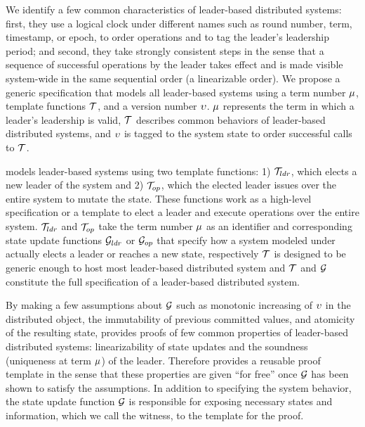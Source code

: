 We identify a few common characteristics of leader-based distributed systems:
first, they use a logical clock under different names such as round number,
term, timestamp, or epoch, to order operations and to tag the leader's
leadership period;
and second, they take strongly consistent steps in the sense that a
sequence of successful operations by the leader takes effect and is made visible
system-wide in the same sequential order (a linearizable order).
We propose a generic specification that models all leader-based systems using a
term number $\mu$, template functions $\mathcal{T}$, and
a version number $\upsilon$. $\mu$ represents the term in which a leader's leadership is valid,
$\mathcal{T}$ describes common behaviors of leader-based distributed systems,
and $\upsilon$ is tagged to the system state to order successful calls to $\mathcal{T}$.


\sysname{} models leader-based systems using two template functions:
1) $\mathcal{T}_{ldr}$, which elects a new leader of the system and
2) $\mathcal{T}_{op}$, which the elected leader issues over the entire system
to mutate the state. These functions work as a high-level specification or a
template to elect a leader and execute operations over the entire system.
$\mathcal{T}_{ldr}$ and $\mathcal{T}_{op}$ take the term number $\mu$ as an identifier
and corresponding state update functions $\mathcal{G}_{ldr}$ or
$\mathcal{G}_{op}$ that specify how a system modeled under \sysname{}
actually elects a leader or reaches a new state, respectively 
$\mathcal{T}$ is designed to be generic enough to host most
leader-based distributed system and $\mathcal{T}$ and $\mathcal{G}$
constitute the full specification of a leader-based distributed system.


By making a few assumptions  about $\mathcal{G}$
such as monotonic increasing of $\upsilon$ in the distributed object,
the immutability of previous committed values, and atomicity of the resulting
state, \sysname{} provides proofs of few common properties of leader-based distributed systems:
linearizability of state updates and the soundness (uniqueness at term $\mu$)
of the leader.
Therefore \sysname{} provides a reusable proof template in the sense that these properties
are given ``for free'' once $\mathcal{G}$ has been shown to satisfy the assumptions.
In addition to specifying the system behavior,
the state update function $\mathcal{G}$ is responsible for exposing necessary
states and information, which we call the witness, to the template for the proof.

